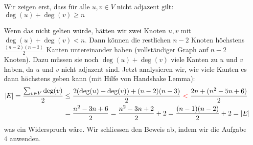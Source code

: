 \documentclass[11pt]{article}
\begin{document}
	Wir zeigen erst, dass für alle $u,v \in V$ nicht adjazent gilt: $\deg(u)+\deg(v) \ge n$
	
	Wenn das  nicht gelten würde, hätten wir zwei Knoten $u,v$ mit $\deg(u)+\deg(v) < n$.
	Dann können die restlichen $n-2$ Knoten höchstens $\frac{(n-2)(n-3)}{2}$ Kanten untereinander haben (vollständiger Graph auf $n-2$ Knoten).
	Dazu müssen sie noch $\deg(u)+\deg(v)$ viele Kanten zu $u$ und $v$ haben, da $u$ und $v$ nicht adjazent sind.
	Jetzt analysieren wir, wie viele Kanten es dann höchstens geben kann (mit Hilfe von Handshake Lemma):
	\begin{align*}
		|E| = \frac{\sum_{v \in V} \deg(v)}{2} 
			&\le \frac{2(\deg(u)+\deg(v)) +(n-2)(n-3)}{2} \color{red} < \color{black} \frac{2n +	(n^2-5n+6)}{2}
		\\ 	&= \frac{n^2-3n+6}{2} = \frac{n^2-3n+2}{2} + 2 = \frac{(n-1)(n-2)}{2} + 2 = |E|
	\end{align*}
	was ein Widerspruch wäre.
	Wir schliessen den Beweis ab, indem wir die Aufgabe 4 anwenden.
\end{document}
